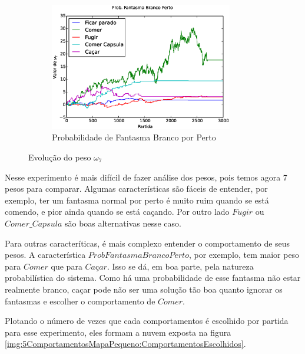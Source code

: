 \begin{figure}[H]
	\centering
	\begin{subfigure}[t]{.5\textwidth}
		\centering
		\includegraphics[width=80mm]{images/5_behaviors_small_map/weights____pol__ProbFantasmaBrancoPerto}
		\caption{Probabilidade de Fantasma Branco por Perto}
	\end{subfigure}%
	\caption{Evolução do peso $ \omega_7 $}
	\label{img:5ComportamentosMapaPequeno:PesoProbFantasmaBrancoPorPerto}
\end{figure}

Nesse experimento é mais difícil de fazer análise dos pesos, pois temos agora 7 pesos para comparar. Algumas características são fáceis de entender, por exemplo, ter um fantasma normal por perto é muito ruim quando se está comendo, e pior ainda quando se está caçando. Por outro lado $ Fugir $ ou $ Comer\_Capsula $ são boas alternativas nesse caso.

Para outras caracteríticas, é mais complexo entender o comportamento de seus pesos. A característica $ Prob Fantasma Branco Perto $, por exemplo, tem maior peso para $ Comer $ que para $ \textit{Caçar} $. Isso se dá, em boa parte, pela natureza probabilística do sistema. Como há uma probabilidade de esse fantasma não estar realmente branco, caçar pode não ser uma solução tão boa quanto ignorar os fantasmas e escolher o comportamento de $ Comer $.

Plotando o número de vezes que cada comportamentos é escolhido por partida para esse experimento, eles formam a nuvem exposta na figura \ref{img:5ComportamentosMapaPequeno:ComportamentosEscolhidos}.

